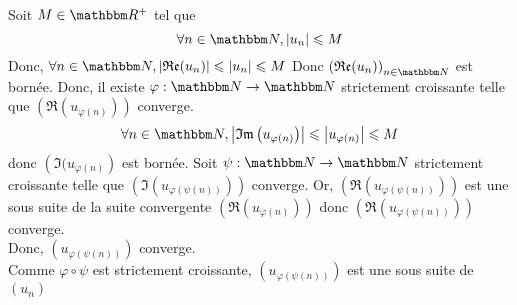 \begin{prv}
	Soit $M \in \R^+$ tel que \[
	\forall n \in \N, \left| u_n \right| \le M
	\] Donc, $\forall n \in \N, \left| \Re(u_n) \right| \le \left| u_n \right| \le M$ Donc $\left( \Re(u_n) \right) _{n \in \N}$ est bornée. Donc, il existe $\varphi: \N \to \N$ strictement croissante telle que $\left( \Re\left( u_{\varphi(n)} \right)  \right) $ converge.
	\[
	\forall n \in \N, \left| \Im \left( u_{\varphi(n)} \right)  \right| \le  \left| u_{\varphi(n)} \right| \le M
	\] donc $\left( \Im(u_{\varphi(n)} \right)$ est bornée. Soit $\psi: \N\to\N$ strictement croissante telle que $\left( \Im\left( u_{\varphi(\psi(n))} \right)  \right) $ converge.
	Or, $\left( \Re\left( u_{\varphi(\psi(n))} \right)  \right) $ est une sous suite de la suite convergente $\left( \Re\left( u_{\varphi(n)} \right)  \right) $ donc $\left( \Re\left( u_{\varphi(\psi(n))} \right)  \right) $ converge. \\
	Donc, $\left( u_{\varphi(\psi(n))} \right) $ converge.\\
	Comme  $\varphi \circ \psi$ est strictement croissante, $\left( u_{\varphi(\psi(n))} \right) $ est une sous suite de $(u_n)$
\end{prv}

